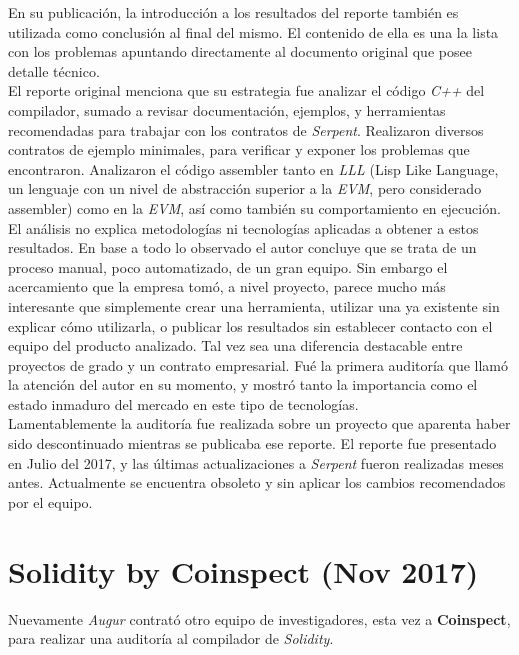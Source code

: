 En su publicación\cite{SerpentCompilerAuditZep}, la introducción a los resultados del reporte también es utilizada como conclusión al final del mismo. El contenido de ella es una la lista con los problemas apuntando directamente al documento original que posee detalle técnico.\\

El reporte original menciona que su estrategia fue analizar el código \textit{C++} del compilador, sumado a revisar documentación, ejemplos, y herramientas recomendadas para trabajar con los contratos de \textit{Serpent}. Realizaron diversos contratos de ejemplo minimales, para verificar y exponer los problemas que encontraron. Analizaron el código assembler tanto en \textit{LLL} (Lisp Like Language, un lenguaje con un nivel de abstracción superior a la \textit{EVM}, pero considerado assembler) como en la \textit{EVM}, así como también su comportamiento en ejecución.\\

El análisis no explica metodologías ni tecnologías aplicadas a obtener a estos resultados. En base a todo lo observado el autor concluye que se trata de un proceso manual, poco automatizado, de un gran equipo. Sin embargo el acercamiento que la empresa tomó, a nivel proyecto, parece mucho más interesante que simplemente crear una herramienta, utilizar una ya existente sin explicar cómo utilizarla, o publicar los resultados sin establecer contacto con el equipo del producto analizado. Tal vez sea una diferencia destacable entre proyectos de grado y un contrato empresarial.
Fué la primera auditoría que llamó la atención del autor en su momento, y mostró tanto la importancia como el estado inmaduro del mercado en este tipo de tecnologías.\\ 

Lamentablemente la auditoría fue realizada sobre un proyecto que aparenta haber sido descontinuado mientras se publicaba ese reporte. El reporte fue presentado en Julio del 2017, y las últimas actualizaciones a \textit{Serpent} fueron realizadas meses antes. Actualmente se encuentra obsoleto y sin aplicar los cambios recomendados por el equipo.


\section{Solidity by Coinspect (Nov 2017)}
Nuevamente \textit{Augur} contrató otro equipo de investigadores, esta vez a \textbf{Coinspect}, para realizar una auditoría al compilador de \textit{Solidity}.\\

